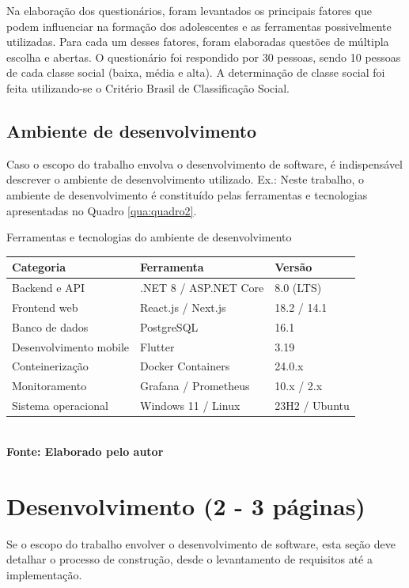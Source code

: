 Na elaboração dos questionários, foram levantados os principais fatores que podem influenciar na formação dos adolescentes e as ferramentas possivelmente utilizadas. Para cada um desses fatores, foram elaboradas questões de múltipla escolha e abertas. O questionário foi respondido por 30 pessoas, sendo 10 pessoas de cada classe social (baixa, média e alta). A determinação de classe social foi feita utilizando-se o Critério Brasil de Classificação Social.


\subsection{\esp Ambiente de desenvolvimento}
Caso o escopo do trabalho envolva o desenvolvimento de software, é indispensável descrever o ambiente de desenvolvimento utilizado. Ex.: Neste trabalho, o ambiente de desenvolvimento é constituído pelas ferramentas e tecnologias apresentadas no Quadro \ref{qua:quadro2}.

\begin{quadro}[H]
    \centering
    \caption{Ferramentas e tecnologias do ambiente de desenvolvimento}
    \label{qua:quadro2}
    \begin{tabular}{|C{4.5cm}|C{4.5cm}|C{3cm}|}
    \hline
    \textbf{Categoria} & \textbf{Ferramenta} & \textbf{Versão} \\ \hline
    Backend e API       & .NET 8 / ASP.NET Core & 8.0 (LTS)     \\ \hline
    Frontend web        & React.js / Next.js    & 18.2 / 14.1   \\ \hline
    Banco de dados      & PostgreSQL            & 16.1          \\ \hline
    Desenvolvimento mobile & Flutter            & 3.19          \\ \hline
    Conteinerização     & Docker Containers     & 24.0.x        \\ \hline
    Monitoramento       & Grafana / Prometheus  & 10.x / 2.x    \\ \hline
    Sistema operacional & Windows 11 / Linux    & 23H2 / Ubuntu \\ \hline
    \end{tabular}
    \vspace{.1cm} 
    \small
    {\footnotesize\\ \textbf{Fonte: Elaborado pelo autor}}
\end{quadro}


\section{\esp Desenvolvimento (2 - 3 páginas)}
Se o escopo do trabalho envolver o desenvolvimento de software, esta seção deve detalhar o processo de construção, desde o levantamento de requisitos até a implementação.

